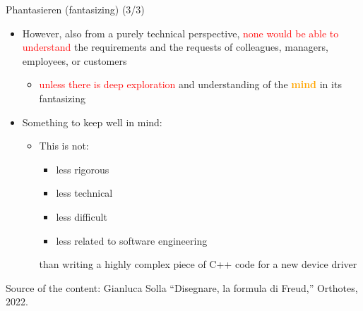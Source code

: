 \documentclass{beamer}
\begin{document}
\begin{frame}
{\centerline{Phantasieren (fantasizing) (3/3)}}
 
\begin{itemize}
   \item However, also from a purely technical perspective, \textcolor{red}{none would be able to understand} the requirements and the requests of colleagues, managers, employees, or customers   
      \begin{itemize}
             \item \textcolor{red}{unless there is deep exploration} and understanding of the \textcolor{orange}{\bf mind} in its fantasizing
    \end{itemize} 
 \item Something to keep well in mind:
 \begin{itemize}
 \item This is not:
  \begin{itemize}
  \item less rigorous
  \item less technical
  \item less difficult
  \item less related to software engineering
 \end{itemize} 
   than writing a highly complex piece of C++ code for a new device driver
 \end{itemize} 
 \end{itemize} 
 
\begin{center}
\tiny
Source of the content: Gianluca Solla ``Disegnare, la formula di Freud,'' Orthotes, 2022.
\end{center}
\end{frame}
\end{document}
